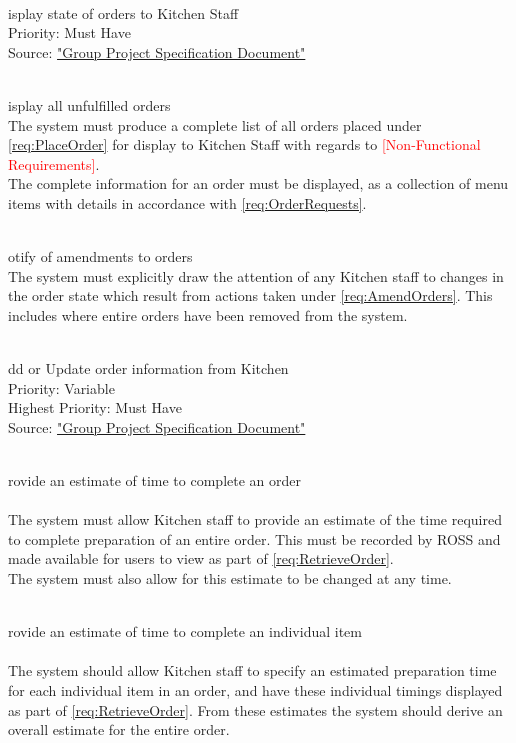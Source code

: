 \documentclass[11pt, a4paper]{report}
\def\itempar#1\\{\item \textbf{#1}\\} %
\begin{document}
\begin{enumerate}[label=F-UR-\arabic*, series=functional]
\itempar Display state of orders to Kitchen Staff\\
Priority: Must Have\\
Source: \href{http://www.macs.hw.ac.uk/~rpp6/teaching/GroupProject/docs/project/GroupProjectSpec2017.pdf}{"Group Project Specification Document"}
\begin{enumerate}[label*=.\arabic*]
\itempar Display all unfulfilled orders\\
The system must produce a complete list of all orders placed under \autoref{req:PlaceOrder} for display to Kitchen Staff with regards to \textcolor{red}{[Non-Functional Requirements]}.\\
The complete information for an order must be displayed, as a collection of menu items with details in accordance with \autoref{req:OrderRequests}.

\itempar Notify of amendments to orders\\
The system must explicitly draw the attention of any Kitchen staff to changes in the order state which result from actions taken under \autoref{req:AmendOrders}. This includes where entire orders have been removed from the system. %
\end{enumerate}

\itempar Add or Update order information from Kitchen\\ %
Priority: Variable\\
Highest Priority: Must Have\\
Source: \href{http://www.macs.hw.ac.uk/~rpp6/teaching/GroupProject/docs/project/GroupProjectSpec2017.pdf}{"Group Project Specification Document"}

\begin{enumerate}[label*=.\arabic*]
\itempar Provide an estimate of time to complete an order\\ %
\underline{}\\
The system must allow Kitchen staff to provide an estimate of the time required to complete preparation of an entire order. This must be recorded by ROSS and made available for users to view as part of \autoref{req:RetrieveOrder}.\\
The system must also allow for this estimate to be changed at any time.

\itempar Provide an estimate of time to complete an individual item\\
\underline{}\\
The system should allow Kitchen staff to specify an estimated preparation time for each individual item in an order, and have these individual timings displayed as part of \autoref{req:RetrieveOrder}. From these estimates the system should derive an overall estimate for the entire order.


\end{enumerate}
\end{enumerate}
\end{document}
